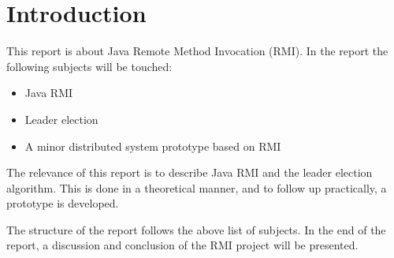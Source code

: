 \chapter{Introduction}

This report is about Java Remote Method Invocation (RMI). In the report the following subjects will be touched:

\begin{itemize}
\item Java RMI
\item Leader election
\item A minor distributed system prototype based on RMI
\end{itemize}

The relevance of this report is to describe Java RMI and the leader election algorithm.
This is done in a theoretical manner, and to follow up practically, a prototype is developed.

The structure of the report follows the above list of subjects. In the end of the report, a discussion and conclusion of the RMI project will be presented. 